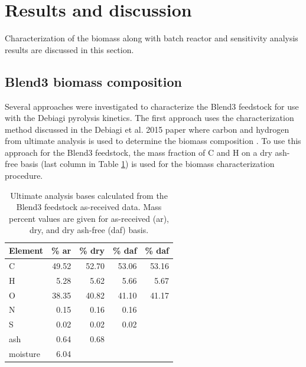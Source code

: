
\section{Results and discussion}

Characterization of the biomass along with batch reactor and sensitivity analysis results are discussed in this section.

\subsection{Blend3 biomass composition}

Several approaches were investigated to characterize the Blend3 feedstock for use with the Debiagi pyrolysis kinetics. The first approach uses the characterization method discussed in the Debiagi et al. 2015 paper where carbon and hydrogen from ultimate analysis is used to determine the biomass composition \cite{Debiagi-2015}. To use this approach for the Blend3 feedstock, the mass fraction of C and H on a dry ash-free basis (last column in Table \ref{tab:blend3-ult-bases}) is used for the biomass characterization procedure.

\begin{table}[H]
    \centering
    \caption{Ultimate analysis bases calculated from the Blend3 feedstock as-received data. Mass percent values are given for as-received (ar), dry, and dry ash-free (daf) basis.}
    \label{tab:blend3-ult-bases}
    \begin{tabular}{lrrrr}
        \toprule
        Element & \% ar & \% dry & \% daf & \% daf \\
        \midrule
        C        & 49.52 & 52.70 & 53.06 & 53.16 \\
        H        & 5.28  & 5.62  & 5.66  & 5.67  \\
        O        & 38.35 & 40.82 & 41.10 & 41.17 \\
        N        & 0.15  & 0.16  & 0.16  &       \\
        S        & 0.02  & 0.02  & 0.02  &       \\
        ash      & 0.64  & 0.68  &       &       \\
        moisture & 6.04  &       &       &       \\
        \bottomrule
    \end{tabular}
\end{table}

